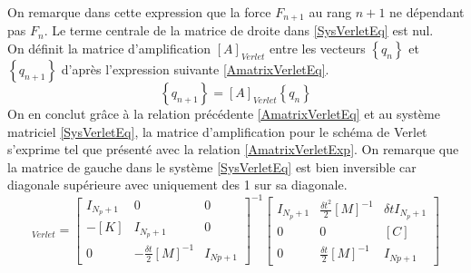 \documentclass[11pt, a4paper]{article}
\begin{document}
On remarque dans cette expression que la force $F_{n+1}$ au rang $n+1$ ne dépendant pas $F_n$. Le terme centrale de la matrice de droite dans \ref{SysVerletEq} est nul. 
\\ On définit la matrice d'amplification $[A]_{Verlet}$ entre les vecteurs $\left\{ q_n \right\}$ et $\left\{ q_{n+1} \right\}$ d'après l'expression suivante \ref{AmatrixVerletEq}.
\begin{equation}
	\left\{ q_{n+1} \right\} = [A]_{Verlet} \left\{ q_n \right\} 
	\label{AmatrixVerletEq}
\end{equation}
On en conclut grâce à la relation précédente \ref{AmatrixVerletEq} et au système matriciel \ref{SysVerletEq}, la matrice d'amplification pour le schéma de Verlet s'exprime tel que présenté avec la relation \ref{AmatrixVerletExp}. On remarque que la matrice de gauche dans le système \ref{SysVerletEq} est bien inversible car diagonale supérieure avec uniquement des 1 sur sa diagonale. 
\begin{equation}
	[A]_{Verlet} = \begin{bmatrix} I_{N_p +1 } & 0 & 0 \\ -[K]&I_{N_p +1}& 0 \\ 0 & -\frac{\delta t}{2} [M]^{-1} & I_{Np +1}\end{bmatrix}^{-1} \begin{bmatrix} I_{N_p +1 } & \frac{\delta t^2}{2} [M]^{-1} & \delta t I_{N_p +1} \\ 0 &0 & [C] \\ 0 & \frac{\delta t}{2} [M]^{-1} & I_{Np +1}\end{bmatrix} 
	\label{AmatrixVerletExp}
\end{equation}
\\
\end{document}
